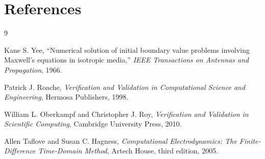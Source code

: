 \documentclass[11pt,a4paper]{article}
\begin{document}
\section{References}

\begin{thebibliography}{9}

Kane S. Yee,
``Numerical solution of initial boundary value problems involving Maxwell's equations in isotropic media,''
\emph{IEEE Transactions on Antennas and Propagation}, 1966.

Patrick J. Roache,
\emph{Verification and Validation in Computational Science and Engineering},
Hermosa Publishers, 1998.

William L. Oberkampf and Christopher J. Roy,
\emph{Verification and Validation in Scientific Computing},
Cambridge University Press, 2010.

Allen Taflove and Susan C. Hagness,
\emph{Computational Electrodynamics: The Finite-Difference Time-Domain Method},
Artech House, third edition, 2005.

\end{thebibliography}
\end{document}
